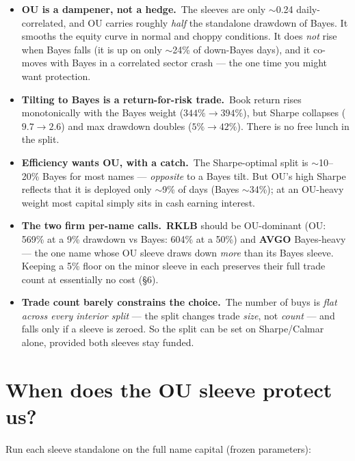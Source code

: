 \documentclass[11pt]{article}
\newcommand{\kpi}[2]{\textbf{#1}\,{\footnotesize\color{bcgrey}#2}}
\begin{document}
\begin{itemize}[leftmargin=1.4em,itemsep=2pt]
  \item \kpi{OU is a dampener, not a hedge.}{} The sleeves are only $\sim$0.24 daily-correlated,
        and OU carries roughly \emph{half} the standalone drawdown of Bayes. It smooths the
        equity curve in normal and choppy conditions. It does \emph{not} rise when Bayes falls
        (it is up on only $\sim$24\% of down-Bayes days), and it co-moves with Bayes in a
        correlated sector crash --- the one time you might want protection.
  \item \kpi{Tilting to Bayes is a return-for-risk trade.}{} Book return rises monotonically
        with the Bayes weight ($344\%\!\to\!394\%$), but Sharpe collapses ($9.7\!\to\!2.6$) and
        max drawdown doubles ($5\%\!\to\!42\%$). There is no free lunch in the split.
  \item \kpi{Efficiency wants OU, with a catch.}{} The Sharpe-optimal split is $\sim$10--20\%
        Bayes for most names --- \emph{opposite} to a Bayes tilt. But OU's high Sharpe reflects
        that it is deployed only $\sim$9\% of days (Bayes $\sim$34\%); at an OU-heavy weight most
        capital simply sits in cash earning interest.
  \item \kpi{The two firm per-name calls.}{} \textbf{RKLB} should be OU-dominant (OU: 569\% at a
        9\% drawdown vs Bayes: 604\% at a 50\%) and \textbf{AVGO} Bayes-heavy --- the one name whose
        OU sleeve draws down \emph{more} than its Bayes sleeve. Keeping a 5\% floor on the minor
        sleeve in each preserves their full trade count at essentially no cost (\S6).
  \item \kpi{Trade count barely constrains the choice.}{} The number of buys is \emph{flat across
        every interior split} --- the split changes trade \emph{size}, not \emph{count} --- and
        falls only if a sleeve is zeroed. So the split can be set on Sharpe/Calmar alone, provided
        both sleeves stay funded.
\end{itemize}

\section{When does the OU sleeve protect us?}

Run each sleeve standalone on the full name capital (frozen parameters):
\end{document}
